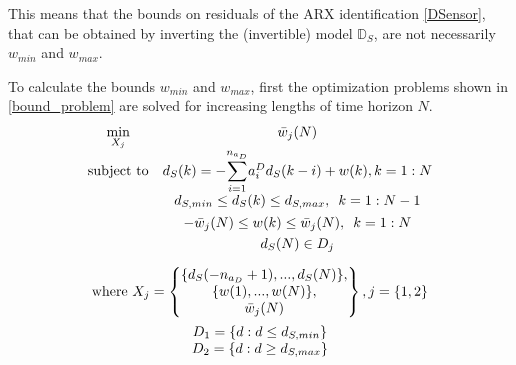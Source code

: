 \documentclass[letterpaper, 10 pt, conference]{ieeeconf}  %
\newcommand{\notimplies}{%
	\mathrel{{\ooalign{\hidewidth$\not\phantom{=}$\hidewidth\cr$\implies$}}}}
\begin{document}
	This means that the bounds on residuals of the ARX identification \eqref{DSensor}, that can be obtained by inverting the (invertible) model $\mathbb{D}_S$, are not necessarily $w_{min}$ and $w_{max}$. 
		
	To calculate the bounds $w_{min}$ and $w_{max}$, first the optimization problems shown in \eqref{bound_problem} are solved for increasing lengths of time horizon $N$.
	\begin{equation}
	\begin{matrix}
	\begin{matrix}
	\underset{X_{j}}{\text{min}}
	& \bar{w}_j(N) \\
	\text{subject to}
	& 
	d_S(k) = -\mathlarger{\sum\limits_{i=1}^{n_{a_D}}}a_i^Dd_S(k-i) + w(k), k={1:N}\\
	&  d_{S,min} \leq d_S(k) \leq d_{S,max}, \hspace{5pt} k={1:N-1} \vspace{4pt}\\
	&  -\bar{w}_j(N) \leq w(k) \leq \bar{w}_j(N), \hspace{5pt} k={1:N} \vspace{3pt}\\
	&  d_S(N) \in D_j 
	\end{matrix}
	\vspace{10pt} \\
	\text{where } X_j = 
	\begin{Bmatrix}
	\{d_S(-n_{a_D}+1),...,d_S(N)\},\\
	\{w(1),...,w(N)\},\vspace{0.001cm}\\
	\bar{w}_j(N)
	\end{Bmatrix}, j=\{1,2\}
	\vspace{5pt}\\
	\begin{matrix}
	D_1 = \{d:d \leq d_{S,min}\}\\
	D_2 = \{d:d \geq d_{S,max}\}
	\end{matrix}
	\end{matrix}
	\label{bound_problem}
	\end{equation}
	
\end{document}
